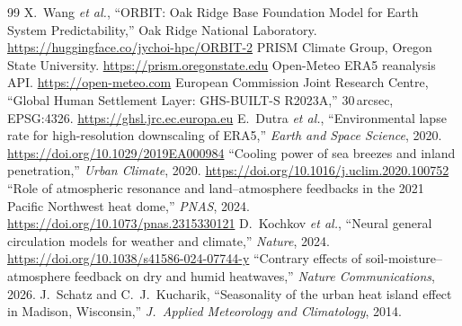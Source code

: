 \documentclass[11pt]{article}
\begin{document}
\begin{thebibliography}{99}
 X.\ Wang \emph{et al.}, ``ORBIT: Oak Ridge Base Foundation Model
for Earth System Predictability,'' Oak Ridge National Laboratory.
\url{https://huggingface.co/jychoi-hpc/ORBIT-2}
 PRISM Climate Group, Oregon State University.
\url{https://prism.oregonstate.edu}
 Open-Meteo ERA5 reanalysis API.
\url{https://open-meteo.com}
 European Commission Joint Research Centre, ``Global Human
Settlement Layer: GHS-BUILT-S R2023A,'' 30\,arcsec, EPSG:4326.
\url{https://ghsl.jrc.ec.europa.eu}
 E.\ Dutra \emph{et al.}, ``Environmental lapse rate for
high-resolution downscaling of ERA5,'' \emph{Earth and Space Science}, 2020.
\url{https://doi.org/10.1029/2019EA000984}
 ``Cooling power of sea breezes and inland penetration,''
\emph{Urban Climate}, 2020. \url{https://doi.org/10.1016/j.uclim.2020.100752}
 ``Role of atmospheric resonance and land--atmosphere feedbacks
in the 2021 Pacific Northwest heat dome,'' \emph{PNAS}, 2024.
\url{https://doi.org/10.1073/pnas.2315330121}
 D.\ Kochkov \emph{et al.}, ``Neural general circulation models
for weather and climate,'' \emph{Nature}, 2024.
\url{https://doi.org/10.1038/s41586-024-07744-y}
 ``Contrary effects of soil-moisture--atmosphere feedback
on dry and humid heatwaves,'' \emph{Nature Communications}, 2026.
 J.\ Schatz and C.\ J.\ Kucharik, ``Seasonality of the urban heat
island effect in Madison, Wisconsin,'' \emph{J.\ Applied Meteorology and
Climatology}, 2014.
\end{thebibliography}
\end{document}
